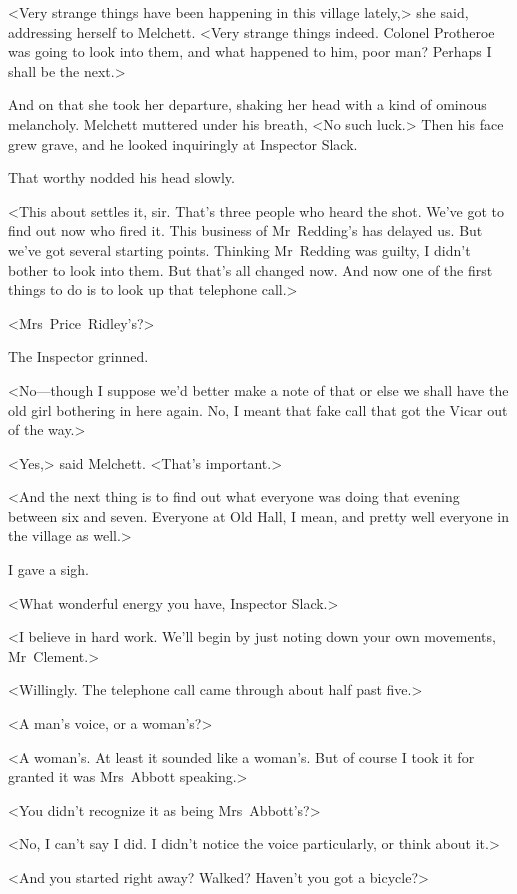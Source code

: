 <Very strange things have been happening in this village lately,> she said, addressing herself to Melchett. <Very strange things indeed. Colonel Protheroe was going to look into them, and what happened to him, poor man? Perhaps I shall be the next.>

And on that she took her departure, shaking her head with a kind of ominous melancholy. Melchett muttered under his breath, <No such luck.> Then his face grew grave, and he looked inquiringly at Inspector Slack.

That worthy nodded his head slowly.

<This about settles it, sir. That's three people who heard the shot. We've got to find out now who fired it. This business of Mr~Redding's has delayed us. But we've got several starting points. Thinking Mr~Redding was guilty, I didn't bother to look into them. But that's all changed now. And now one of the first things to do is to look up that telephone call.>

<Mrs~Price~Ridley's?>

The Inspector grinned.

<No—though I suppose we'd better make a note of that or else we shall have the old girl bothering in here again. No, I meant that fake call that got the Vicar out of the way.>

<Yes,> said Melchett. <That's important.>

<And the next thing is to find out what everyone was doing that evening between six and seven. Everyone at Old Hall, I mean, and pretty well everyone in the village as well.>

I gave a sigh.

<What wonderful energy you have, Inspector Slack.>

<I believe in hard work. We'll begin by just noting down your own movements, Mr~Clement.>

<Willingly. The telephone call came through about half past five.>

<A man's voice, or a woman's?>

<A woman's. At least it sounded like a woman's. But of course I took it for granted it was Mrs~Abbott speaking.>

<You didn't recognize it as being Mrs~Abbott's?>

<No, I can't say I did. I didn't notice the voice particularly, or think about it.>

<And you started right away? Walked? Haven't you got a bicycle?>

